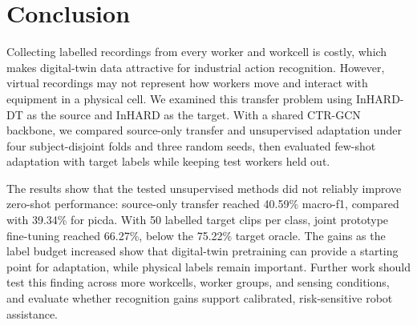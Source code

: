 \documentclass[3p,times,procedia]{elsarticle}
\begin{document}
\section{Conclusion}
\label{sec:conclusion}

Collecting labelled recordings from every worker and workcell is costly, which
makes digital-twin data attractive for industrial action recognition. However,
virtual recordings may not represent how workers move and interact with
equipment in a physical cell. We examined this transfer problem using InHARD-DT
as the source and InHARD as the target. With a shared CTR-GCN backbone, we
compared source-only transfer and unsupervised adaptation under four
subject-disjoint folds and three random seeds, then evaluated few-shot
adaptation with target labels while keeping test workers held out.

The results show that the tested unsupervised methods did not reliably improve
zero-shot performance: source-only transfer reached 40.59\% macro-\acs{f1},
compared with 39.34\% for \acs{picda}. With 50 labelled target clips per class,
joint prototype fine-tuning reached 66.27\%, below the 75.22\% target oracle.
The gains as the label budget increased show that digital-twin pretraining can
provide a starting point for adaptation, while physical labels remain important.
Further work should test this finding across more workcells, worker groups, and
sensing conditions, and evaluate whether recognition gains support calibrated,
risk-sensitive robot assistance.
\newpage


\end{document}
